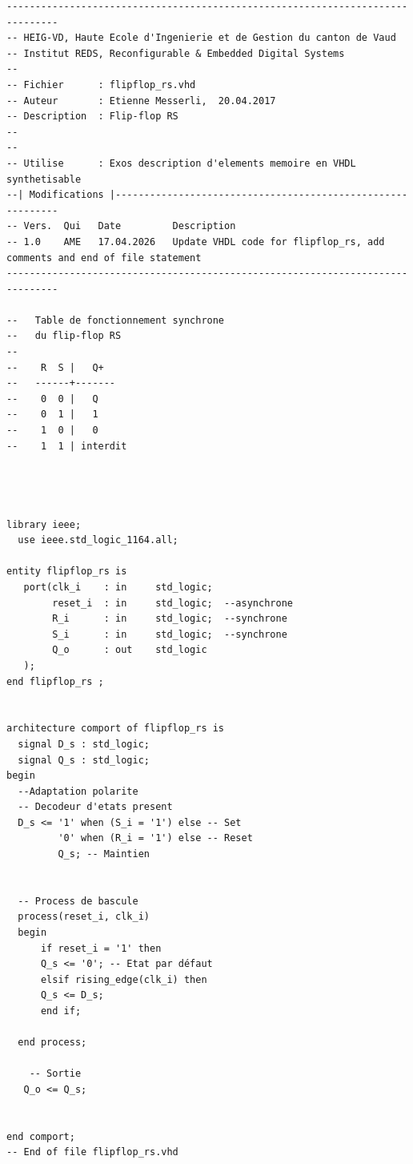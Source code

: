 \begin{verbatim}
-------------------------------------------------------------------------------
-- HEIG-VD, Haute Ecole d'Ingenierie et de Gestion du canton de Vaud
-- Institut REDS, Reconfigurable & Embedded Digital Systems
--
-- Fichier      : flipflop_rs.vhd
-- Auteur       : Etienne Messerli,  20.04.2017
-- Description  : Flip-flop RS
-- 
-- 
-- Utilise      : Exos description d'elements memoire en VHDL synthetisable
--| Modifications |------------------------------------------------------------
-- Vers.  Qui   Date         Description
-- 1.0    AME   17.04.2026   Update VHDL code for flipflop_rs, add comments and end of file statement
-------------------------------------------------------------------------------

--   Table de fonctionnement synchrone
--   du flip-flop RS
--
--    R  S |   Q+
--   ------+-------
--    0  0 |   Q
--    0  1 |   1
--    1  0 |   0
--    1  1 | interdit




library ieee;
  use ieee.std_logic_1164.all;

entity flipflop_rs is
   port(clk_i    : in     std_logic;
        reset_i  : in     std_logic;  --asynchrone
        R_i      : in     std_logic;  --synchrone
        S_i      : in     std_logic;  --synchrone
        Q_o      : out    std_logic
   );
end flipflop_rs ;


architecture comport of flipflop_rs is
  signal D_s : std_logic;
  signal Q_s : std_logic;
begin
  --Adaptation polarite
  -- Decodeur d'etats present
  D_s <= '1' when (S_i = '1') else -- Set
         '0' when (R_i = '1') else -- Reset
         Q_s; -- Maintien
  

  -- Process de bascule
  process(reset_i, clk_i)
  begin
      if reset_i = '1' then
      Q_s <= '0'; -- Etat par défaut
      elsif rising_edge(clk_i) then
      Q_s <= D_s;
      end if;
  
  end process;
  
    -- Sortie
   Q_o <= Q_s;


end comport;
-- End of file flipflop_rs.vhd
\end{verbatim}
\newpage
